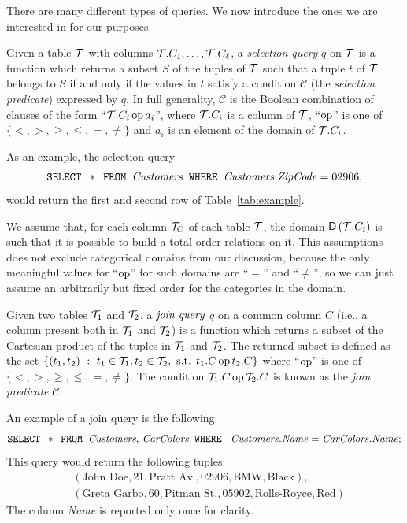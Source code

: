 There are many different types of queries. We now introduce the ones we are interested
in for our purposes.
\begin{definition}\label{def:selectquery}
  Given a table ${\cal T}$ with columns ${\cal T}.C_1,\dotsc,{\cal T}.C_\ell$, a
  \emph{selection query} $q$ on ${\cal T}$ is a function which returns a subset
  $S$ of the tuples of ${\cal T}$ such that a tuple $t$ of ${\cal T}$ belongs to $S$ if
  and only if the values in $t$ satisfy a condition $\mathcal{C}$
  (the \emph{selection predicate}) expressed by $q$. In full
  generality, $\mathcal{C}$ is the Boolean combination of clauses of the form
  ``${\cal T}.C_i \operatorname{op} a_i$'', where ${\cal T}.C_i$ is a column of ${\cal T}$, ``$\operatorname{op}$'' is one
  of $\{<,>,\ge,\le,=,\neq\}$ and $a_i$ is an element of the domain of
  ${\cal T}.C_i$.
\end{definition}

As an example, the selection query 
\[
\text{\texttt{SELECT }} * \text{\texttt{ FROM }} \text{\emph{Customers}} \text{\texttt{ WHERE }} \text{\emph{Customers.ZipCode}} = 02906;
\]
would return the first and second row of Table~\ref{tab:example}.

We assume that, for each column ${\cal T}_C$ of each table ${\cal T}$, the domain
$\mathsf{D}\left({\cal T}.C_i\right)$ is such that it is possible to build a total order relations
on it. This assumptions does not exclude categorical domains from our
discussion, because the only meaningful values for ``$\operatorname{op}$'' for such domains
are ``$=$'' and ``$\neq$'', so we can just assume an arbitrarily but fixed order
for the categories in the domain.

\begin{definition}\label{def:joinquery}
  Given two tables ${\cal T}_1$ and ${\cal T}_2$, a $\emph{join query}$ $q$ on a common
  column $C$ (i.e., a column present both in ${\cal T}_1$ and ${\cal T}_2$) is a
  function which returns a subset of the Cartesian product of the tuples in
  ${\cal T}_1$ and ${\cal T}_2$. The returned subset is defined as the set $ \{(t_1,t_2)
  ~:~ t_1\in{\cal T}_1, t_2\in{\cal T}_2, \text{ s.t. } t_1.C \operatorname{op} t_2.C \}$ where
  ``$\operatorname{op}$'' is one of $\{<,>,\ge,\le,=,\neq\}$.
  The condition ${\cal T}_1.C \operatorname{op} {\cal T}_2.C$ is known as the \emph{join predicate}
  $\mathcal{C}$.
\end{definition}
An example of a join query is the following:
\[
\text{\texttt{SELECT }} * \text{\texttt{ FROM }} \text{\emph{Customers}, \emph{CarColors}} \text{\texttt{ WHERE }} \text{ 
\emph{Customers.Name}} = \text{\emph{CarColors.Name}};
\]
This query would return the following tuples:
\begin{align*}
  &(\text{John Doe}, 21, \text{Pratt Av.}, \text{02906}, \text{BMW}, \text{Black}), \\
  &(\text{Greta Garbo}, 60, \text{Pitman St.}, \text{05902}, \text{Rolls-Royce}, \text{Red})
\end{align*}
The column \emph{Name} is reported only once for clarity.

